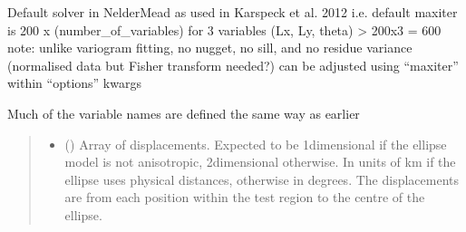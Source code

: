 \documentclass[letterpaper,10pt,english]{sphinxmanual}
\begin{document}
\begin{fulllineitems}
\begin{fulllineitems}
\label{\detokenize{ellipse:glomar_gridding.ellipse.EllipseModel.fit}}
\pysigstartsignatures
\pysiglinewithargsret
{}
{\sphinxparamcomma {}\sphinxparamcomma {}\sphinxparamcomma {}\sphinxparamcomma {}\sphinxparamcomma {}\sphinxparamcomma {}\sphinxparamcomma {}\sphinxparamcomma {}\sphinxparamcomma {}\sphinxparamcomma {}\sphinxparamcomma {}}
{}
\pysigstopsignatures
\sphinxAtStartPar
Default solver in Nelder\sphinxhyphen{}Mead as used in Karspeck et al. 2012
i.e. 
default max\sphinxhyphen{}iter is 200 x (number\_of\_variables)
for 3 variables (Lx, Ly, theta) \textendash{}\textgreater{} 200x3 = 600
note: unlike variogram fitting, no nugget, no sill, and no residue
variance (normalised data but Fisher transform needed?)
can be adjusted using “maxiter” within “options” kwargs

\sphinxAtStartPar
Much of the variable names are defined the same way as earlier
\begin{quote}\begin{description}
\begin{itemize}
\item {}
\sphinxAtStartPar
{} () \textendash{} Array of displacements. Expected to be 1\sphinxhyphen{}dimensional if the ellipse
model is not anisotropic, 2\sphinxhyphen{}dimensional otherwise. In units of km if
the ellipse uses physical distances, otherwise in degrees. The
displacements are from each position within the test region to the
centre of the ellipse.


\end{itemize}
\end{description}
\end{quote}
\end{fulllineitems}
\end{fulllineitems}
\end{document}
